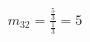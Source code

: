 \documentclass[preview]{standalone}
\begin{document}
\begin{align*}
m_{32} = \frac{\frac{5}{3}}{\frac{1}{3}} = 5
\end{align*}
\end{document}
